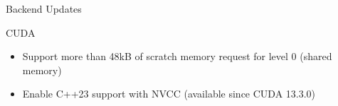 
\begin{frame}[fragile]

  {\Huge Backend Updates}

  \vspace{10pt}

\end{frame}





%



\begin{frame}[fragile]

  {\Large CUDA}
  \begin{itemize}
    \item Support more than 48kB of scratch memory request for level 0 (shared memory)
    \item Enable C++23 support with NVCC (available since CUDA 13.3.0)
  \end{itemize}

\end{frame}

